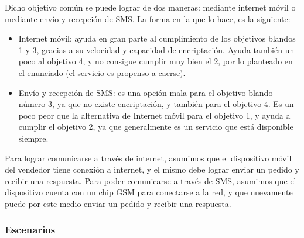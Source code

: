 Dicho objetivo común se puede lograr de dos maneras: mediante internet móvil o mediante envío y recepción de SMS. La forma en la que lo hace, es la siguiente:
\begin{itemize}
  \item Internet móvil: ayuda en gran parte al cumplimiento de los objetivos blandos 1 y 3, gracias a su velocidad y capacidad de encriptación. Ayuda también un poco al objetivo 4, y no consigue cumplir muy bien el 2, por lo planteado en el enunciado (el servicio es propenso a caerse).

  \item Envío y recepción de SMS: es una opción mala para el objetivo blando número 3, ya que no existe encriptación, y también para el objetivo 4. Es un poco peor que la alternativa de Internet móvil para el objetivo 1, y ayuda a cumplir el objetivo 2, ya que generalmente es un servicio que está disponible siempre.
\end{itemize}

\indent Para lograr comunicarse a través de internet, asumimos que el dispositivo móvil del vendedor tiene conexión a internet, y el mismo debe lograr enviar un pedido y recibir una respuesta. Para poder comunicarse a través de SMS, asumimos que el dispositivo cuenta con un chip GSM para conectarse a la red, y que nuevamente puede por este medio enviar un pedido y recibir una respuesta.

\subsubsection{Escenarios}


